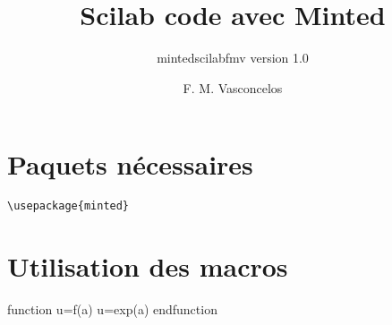 \documentclass[a4paper,9pt]{article}
\title{Scilab code avec Minted}
\subtitle{mintedscilabfmv version 1.0}
\author{F. M. Vasconcelos}
\date{}
\begin{document}
\maketitle
\begin{abstract}
\end{abstract}

\section{Paquets nécessaires}                                                         
\begin{verbatim}                                                                      
\usepackage{minted}
\end{verbatim} 
\section{Utilisation des macros}                                                         
\begin{Scilabcode}
    function u=f(a)
        u=exp(a)
    endfunction
\end{Scilabcode}
\begin{tcolorbox}[enhanced,
                  breakable,
                  sharpish corners,
                  width=\linewidth,
                  colframe=white,
                  colback=blue!8]
\end{tcolorbox}
\end{document}
